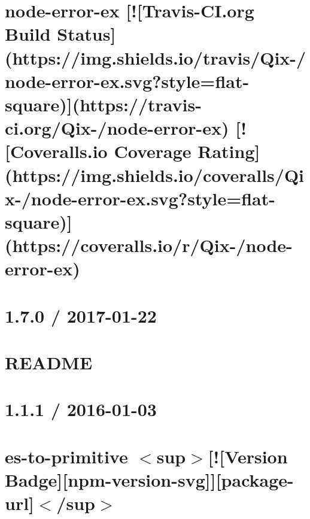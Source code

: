 \documentclass[twoside]{book}
\newcommand{\+}{\discretionary{\mbox{\scriptsize$\hookleftarrow$}}{}{}}
\begin{document}
\chapter{node-\/error-\/ex \mbox{[}!\mbox{[}Travis-\/\+CI.org Build Status\mbox{]}(https\+://img.shields.\+io/travis/\+Qix-\//node-\/error-\/ex.svg?style=flat-\/square)\mbox{]}(https\+://travis-\/ci.org/\+Qix-\//node-\/error-\/ex) \mbox{[}!\mbox{[}Coveralls.\+io Coverage Rating\mbox{]}(https\+://img.shields.\+io/coveralls/\+Qix-\//node-\/error-\/ex.svg?style=flat-\/square)\mbox{]}(https\+://coveralls.io/r/\+Qix-\//node-\/error-\/ex)}
\label{md__c_1_workspace_demo_src_main_script_node_modules_error-ex__r_e_a_d_m_e}

\chapter{1.7.0 / 2017-\/01-\/22}
\label{md__c_1_workspace_demo_src_main_script_node_modules_es-abstract__c_h_a_n_g_e_l_o_g}

\chapter{R\+E\+A\+D\+ME}
\label{md__c_1_workspace_demo_src_main_script_node_modules_es-abstract__r_e_a_d_m_e}

\chapter{1.1.1 / 2016-\/01-\/03}
\label{md__c_1_workspace_demo_src_main_script_node_modules_es-to-primitive__c_h_a_n_g_e_l_o_g}

\chapter{es-\/to-\/primitive $<$sup$>$\mbox{[}!\mbox{[}Version Badge\mbox{]}\mbox{[}npm-\/version-\/svg\mbox{]}\mbox{]}\mbox{[}package-\/url\mbox{]}$<$/sup$>$}
\label{md__c_1_workspace_demo_src_main_script_node_modules_es-to-primitive__r_e_a_d_m_e}

\end{document}
